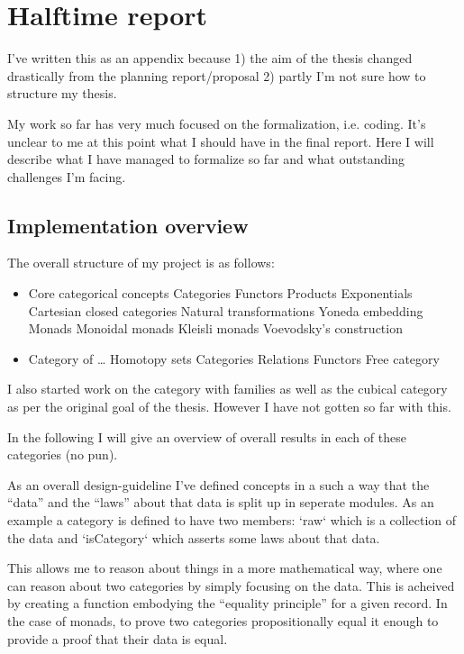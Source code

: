 \chapter{Halftime report}
I've written this as an appendix because 1) the aim of the thesis changed
drastically from the planning report/proposal 2) partly I'm not sure how to
structure my thesis.

My work so far has very much focused on the formalization, i.e. coding. It's
unclear to me at this point what I should have in the final report. Here I will
describe what I have managed to formalize so far and what outstanding challenges
I'm facing.

\section{Implementation overview}
The overall structure of my project is as follows:

\begin{itemize}
\item Core categorical concepts
\subitem Categories
\subitem Functors
\subitem Products
\subitem Exponentials
\subitem Cartesian closed categories
\subitem Natural transformations
\subitem Yoneda embedding
\subitem Monads
\subsubitem Monoidal monads
\subsubitem Kleisli monads
\subsubitem Voevodsky's construction
\item Category of \ldots
\subitem Homotopy sets
\subitem Categories
\subitem Relations
\subitem Functors
\subitem Free category
\end{itemize}

I also started work on the category with families as well as the cubical
category as per the original goal of the thesis. However I have not gotten so
far with this.

In the following I will give an overview of overall results in each of these
categories (no pun).

As an overall design-guideline I've defined concepts in a such a way that the
``data'' and the ``laws'' about that data is split up in seperate modules. As an
example a category is defined to have two members: `raw` which is a collection
of the data and `isCategory` which asserts some laws about that data.

This allows me to reason about things in a more mathematical way, where one can
reason about two categories by simply focusing on the data. This is acheived by
creating a function embodying the ``equality principle'' for a given record. In
the case of monads, to prove two categories propositionally equal it enough to
provide a proof that their data is equal.

